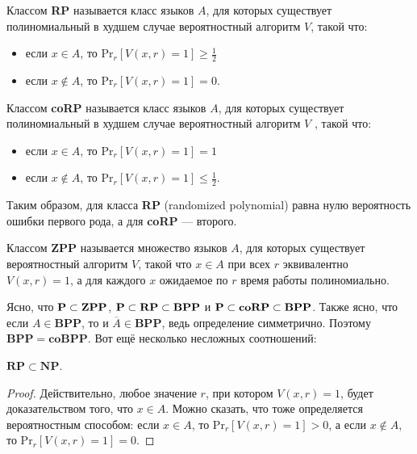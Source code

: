 \begin{definition}
     Классом \textbf{RP} называется класс языков $A$, для которых существует полиномиальный в худшем случае вероятностный алгоритм $V$, такой что:

    \begin{itemize}
    \item  если $x \in A$, то Pr$_r [V(x, r) = 1] \geq \frac{1}{2}$
    \item  если $x \not \in A$, то Pr$_r [V(x, r) = 1] = 0$.
    \end{itemize}
\end{definition}

\begin{definition}
    Классом \textbf{coRP} называется класс языков $A$, для которых существует полиномиальный в худшем случае вероятностный алгоритм $V$ , такой что:

    \begin{itemize}
    \item  если $x \in A$, то Pr$_r [V(x, r) = 1] = 1$
    \item  если $x \not \in A$, то Pr$_r [V(x, r) = 1] \leq \frac{1}{2}$.
    \end{itemize}

    Таким образом, для класса \textbf{RP} (randomized polynomial) равна нулю вероятность ошибки первого рода, а для \textbf{coRP} — второго.
    
\end{definition}

\begin{definition}
    Классом \textbf{ZPP} называется множество языков $A$, для которых существует вероятностный алгоритм $V$, такой что $x \in A$ при всех $r$ эквивалентно $V(x, r) = 1$, а для каждого $x$ ожидаемое по $r$ время работы полиномиально.
\end{definition}

Ясно, что $\textbf{P} \subset \mathbf{ZPP}$, $\textbf{P} \subset \mathbf{RP} \subset \mathbf{BPP}$ и $\textbf{P} \subset \mathbf{coRP} \subset \mathbf{BPP}$. Также ясно,
что если $A \in \mathbf{BPP}$, то и $\overline{A} \in \mathbf{BPP}$, ведь определение симметрично. Поэтому $\mathbf{BPP} = \mathbf{coBPP}$. Вот ещё несколько несложных соотношений:

\begin{statement}
    $\mathbf{RP} \subset \mathbf{NP}$.
\end{statement}

\begin{proof}
 Действительно, любое значение $r$, при котором $V(x, r) = 1$, будет доказательством того, что $x \in A$. Можно сказать, что \np тоже определяется вероятностным способом: если $x \in A$, то Pr$_r [V(x, r) = 1] > 0$, а если $x \not \in A$,
то Pr$_r[V(x, r) = 1] = 0$.    
\end{proof}

